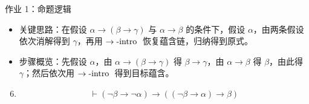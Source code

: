 
\begin{frame}[allowframebreaks]{作业 1：命题逻辑}
\pause
\begin{slidesolution}
  \begin{itemize}
    \item 关键思路：在假设 $\alpha\to(\beta\to\gamma)$ 与 $\alpha\to\beta$ 的条件下，假设 $\alpha$，由两条假设依次消解得到 $\gamma$，再用 $\to\text{-intro}\;$ 恢复蕴含链，归纳得到原式。
    \pause
    \item 步骤概览：先假设 $\alpha$，由 $\alpha\to(\beta\to\gamma)$ 得 $\beta\to\gamma$，由 $\alpha\to\beta$ 得 $\beta$，由此得 $\gamma$；然后依次用 $\to\text{-intro}\;$ 得到目标蕴含。
  \end{itemize}
\end{slidesolution}
\pause
\begin{enumerate}[(1)]
  \setcounter{enumi}{5}
  \item
    \[\vdash (\lnot \beta \to \lnot \alpha) \to ((\lnot \beta \to \alpha) \to \beta)\]
\end{enumerate}


\end{frame}
